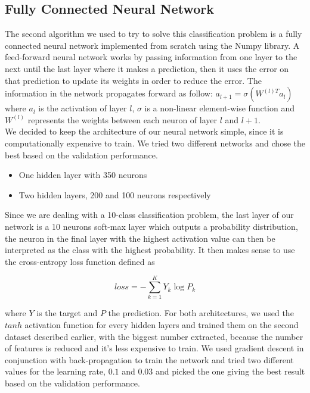 \documentclass[letterpaper, 10 pt, conference]{ieeeconf}  %
\begin{document}
\subsection{Fully Connected Neural Network}
The second algorithm we used to try to solve this classification problem is a fully connected neural network implemented from scratch using the Numpy library. A feed-forward neural network works by passing information from one layer to the next until the last layer where it makes a prediction, then it uses the error on that prediction to update its weights in order to reduce the error. The information in the network propagates forward as follow: $a_{l+1} = \sigma (W^{(l)T}a_l)$ where $a_l$ is the activation of layer $l$, $\sigma$ is a non-linear element-wise function and $W^{(l)}$ represents the weights between each neuron of layer $l$ and $l+1$. \\
We decided to keep the architecture of our neural network simple, since it is computationally expensive to train. We tried two different networks and chose the best based on the validation performance.
\begin{itemize}
\item One hidden layer with 350 neurons
\item Two hidden layers, 200 and 100 neurons respectively
\end{itemize}
Since we are dealing with a 10-class classification problem, the last layer of our network is a 10 neurons soft-max layer which outputs a probability distribution, the neuron in the final layer with the highest activation value can then be interpreted as the class with the highest probability. It then makes sense to use the cross-entropy loss function defined as
\begin{center}
$$loss = - \sum_{k=1}^{K}Y_k \log{P_k}$$
\end{center}
where $Y$ is the target and $P$ the prediction.
For both architectures, we used the $tanh$ activation function for every hidden layers and trained them on the second dataset described earlier, with the biggest number extracted, because the number of features is reduced and it's less expensive to train. We used gradient descent in conjunction with back-propagation to train the network and tried two different values for the learning rate, $0.1$ and $0.03$ and picked the one giving the best result based on the validation performance.
\end{document}
